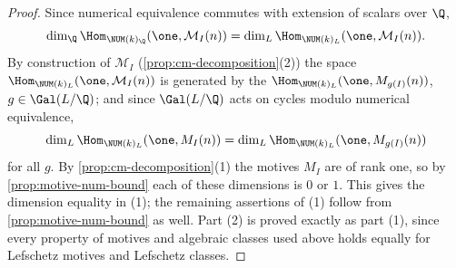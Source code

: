 \begin{proof}
  Since numerical equivalence commutes with extension of scalars over \(\Q\),
  \[\dim_\Q \Hom_{\NUM(k)_\Q}(\one, \mathcal{M}_I(n)) =
    \dim_L \Hom_{\NUM(k)_L}(\one, \mathcal{M}_I(n)).\]
  By construction of \(\mathcal{M}_I\) (\cref{prop:cm-decomposition}(2)) the space
  \(\Hom_{\NUM(k)_L}(\one, \mathcal{M}_I(n))\) is generated by the
  \(\Hom_{\NUM(k)_L}(\one, M_{g(I)}(n))\), \(g \in \Gal(L/\Q)\); and since
  \(\Gal(L/\Q)\) acts on cycles modulo numerical equivalence,
  \[\dim_L \Hom_{\NUM(k)_L}(\one, M_{I}(n)) =
    \dim_L \Hom_{\NUM(k)_L}(\one, M_{g(I)}(n))\]
  for all \(g\). By \cref{prop:cm-decomposition}(1) the motives \(M_I\) are of
  rank one, so by \cref{prop:motive-num-bound} each of these dimensions is \(0\)
  or \(1\). This gives the dimension equality in (1); the remaining assertions of
  (1) follow from \cref{prop:motive-num-bound} as well. Part (2) is proved
  exactly as part (1), since every property of motives and algebraic classes used
  above holds equally for Lefschetz motives and Lefschetz classes.
\end{proof}

